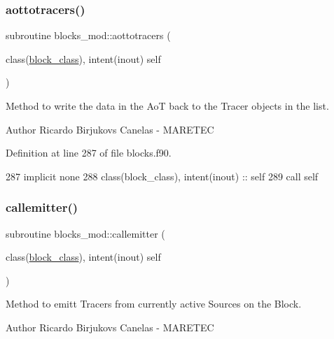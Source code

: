 \subsubsection{\texorpdfstring{aottotracers()}{aottotracers()}}
{\footnotesize\ttfamily subroutine blocks\+\_\+mod\+::aottotracers (\begin{DoxyParamCaption}\item[{class(\mbox{\hyperlink{structblocks__mod_1_1block__class}{block\+\_\+class}}), intent(inout)}]{self }\end{DoxyParamCaption})\hspace{0.3cm}{\ttfamily [private]}}



Method to write the data in the AoT back to the Tracer objects in the list. 

\begin{DoxyAuthor}{Author}
Ricardo Birjukovs Canelas -\/ M\+A\+R\+E\+T\+EC 
\end{DoxyAuthor}


Definition at line 287 of file blocks.\+f90.


\begin{DoxyCode}
287     \textcolor{keywordtype}{implicit none}
288     \textcolor{keywordtype}{class}(block\_class), \textcolor{keywordtype}{intent(inout)} :: self
289     \textcolor{keyword}{call }self%
\end{DoxyCode}
\mbox{\label{namespaceblocks__mod_a2c3cf5113e1422d812c2c869afde2729}} 
\subsubsection{\texorpdfstring{callemitter()}{callemitter()}}
{\footnotesize\ttfamily subroutine blocks\+\_\+mod\+::callemitter (\begin{DoxyParamCaption}\item[{class(\mbox{\hyperlink{structblocks__mod_1_1block__class}{block\+\_\+class}}), intent(inout)}]{self }\end{DoxyParamCaption})\hspace{0.3cm}{\ttfamily [private]}}



Method to emitt Tracers from currently active Sources on the Block. 

\begin{DoxyAuthor}{Author}
Ricardo Birjukovs Canelas -\/ M\+A\+R\+E\+T\+EC 
\end{DoxyAuthor}


